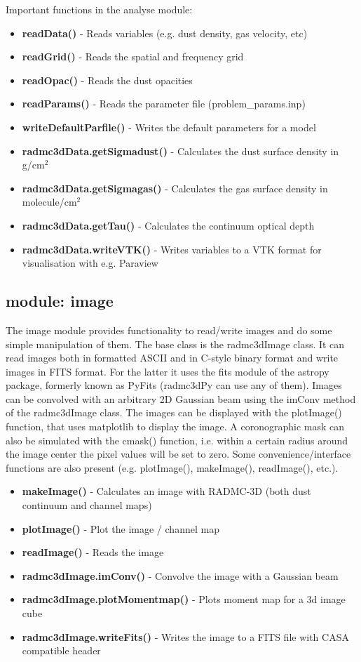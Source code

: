 \documentclass[12pt]{article}
\begin{document}
Important functions in the analyse module:
\begin{itemize}
\item[]{\bf readData()} - Reads variables (e.g. dust density, gas velocity, etc)
\item[]{\bf readGrid()} - Reads the spatial and frequency grid
\item[]{\bf readOpac()} - Reads the dust opacities
\item[]{\bf readParams()} - Reads the parameter file (problem\_params.inp)
\item[]{\bf writeDefaultParfile()} - Writes the default parameters for a model
\item[]{\bf radmc3dData.getSigmadust()} - Calculates the dust surface density in g/cm$^2$
\item[]{\bf radmc3dData.getSigmagas()} - Calculates the gas surface density in molecule/cm$^2$
\item[]{\bf radmc3dData.getTau()} - Calculates the continuum optical depth 
\item[]{\bf radmc3dData.writeVTK()} - Writes variables to a VTK format for visualisation with e.g. Paraview 
\end{itemize}

\subsection{module: image}
\label{subsec:image}

The image module provides functionality to read/write images and do some simple manipulation of them. 
The base class is the radmc3dImage class. It can read images both in formatted ASCII and in C-style binary format 
and write images in FITS format. For the latter it uses the fits module of the astropy package, formerly known as 
PyFits (radmc3dPy can use any of them). Images can be convolved with an arbitrary 2D Gaussian beam 
using the imConv method of the radmc3dImage class. The images can be displayed with the plotImage() function, 
that uses matplotlib to display the image. A coronographic mask can also be simulated with the cmask() function, 
i.e. within a certain radius around the image center the pixel values will be set to zero.  Some convenience/interface 
functions are also present (e.g. plotImage(), makeImage(), readImage(), etc.). 

\begin{itemize}
\item[]{\bf makeImage()} - Calculates an image with RADMC-3D (both dust continuum and channel maps)
\item[]{\bf plotImage()} - Plot the image / channel map
\item[]{\bf readImage()} - Reads the image 
\item[]{\bf radmc3dImage.imConv()} - Convolve the image with a Gaussian beam 
\item[]{\bf radmc3dImage.plotMomentmap()} - Plots moment map for a 3d image cube
\item[]{\bf radmc3dImage.writeFits()} - Writes the image to a FITS file with CASA compatible header
\end{itemize}
\end{document}

